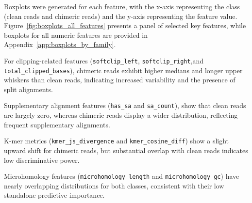 Boxplots were generated for each feature, with the x-axis representing the class (clean reads and chimeric reads) and the y-axis representing the feature value. Figure~\ref{fig:boxplots_all_features} presents a panel of selected key features, while boxplots for all numeric features are provided in Appendix~\ref{app:boxplots_by_family}.

For clipping-related features (\texttt{softclip\_left}, \texttt{softclip\_right},\linebreak and \texttt{total\_clipped\_bases}), chimeric reads exhibit higher medians and longer upper whiskers than clean reads, indicating increased variability and the presence of split alignments.

Supplementary alignment features (\texttt{has\_sa} and \texttt{sa\_count}), show that clean reads are largely zero, whereas chimeric reads display a wider distribution, reflecting frequent supplementary alignments.

K-mer metrics (\texttt{kmer\_js\_divergence} and \texttt{kmer\_cosine\_diff}) show a slight upward shift for chimeric reads, but substantial overlap with clean reads indicates low discriminative power.

Microhomology features (\texttt{microhomology\_length} and \texttt{microhomology\_gc}) have nearly overlapping distributions for both classes, consistent with their low standalone predictive importance.

